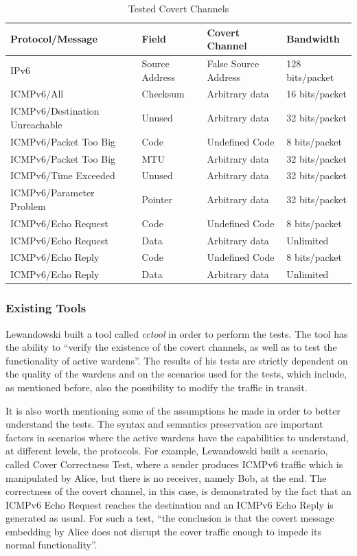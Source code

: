 \documentclass[12pt]{article}
\begin{document}
\begin{savenotes}
\begin{table}[!htpb]
\centering
\begin{tabular}{|C{4.5cm}|C{3.0cm}|C{3.5cm}|C{3.0cm}|}
\hline
Protocol/Message&Field&Covert Channel&Bandwidth\\
\hline
IPv6&Source Address&False Source Address&128 bits/packet\\
\hline
ICMPv6/All&Checksum&Arbitrary data&16 bits/packet\\
\hline
ICMPv6/Destination Unreachable&Unused&Arbitrary data&32 bits/packet\\
\hline
ICMPv6/Packet Too Big&Code&Undefined Code&8 bits/packet\\
\hline
ICMPv6/Packet Too Big&MTU&Arbitrary data&32 bits/packet\\
\hline
ICMPv6/Time Exceeded&Unused&Arbitrary data&32 bits/packet\\
\hline
ICMPv6/Parameter Problem&Pointer&Arbitrary data&32 bits/packet\\
\hline
ICMPv6/Echo Request&Code&Undefined Code&8 bits/packet\\
\hline
ICMPv6/Echo Request&Data&Arbitrary data&Unlimited\\
\hline
ICMPv6/Echo Reply&Code&Undefined Code&8 bits/packet\\
\hline
ICMPv6/Echo Reply&Data&Arbitrary data&Unlimited\\
\hline
\end{tabular}
\caption{Tested Covert Channels}
\label{table:testedCC}
\end{table}
\end{savenotes}

\subsubsection{Existing Tools}
\label{subsub:tools}

Lewandowski built a tool called \textit{cctool} in order to perform the tests. The tool has the ability to ``verify the existence of the covert channels, as well as to test the functionality of active wardens''. The results of his tests are strictly dependent on the quality of the wardens and on the scenarios used for the tests, which include, as mentioned before, also the possibility to modify the traffic in transit.

It is also worth mentioning some of the assumptions he made in order to better understand the tests. The syntax and semantics preservation are important factors in scenarios where the active wardens have the capabilities to understand, at different levels, the protocols. For example, Lewandowski built a scenario, called Cover Correctness Test, where a sender produces ICMPv6 traffic which is manipulated by Alice, but there is no receiver, namely Bob, at the end. The correctness of the covert channel, in this case, is demonstrated by the fact that an ICMPv6 Echo Request reaches the destination and an ICMPv6 Echo Reply is generated as usual. For such a test, ``the conclusion is that the covert message embedding by Alice does not disrupt the cover traffic enough to impede its normal functionality''.
\end{document}
